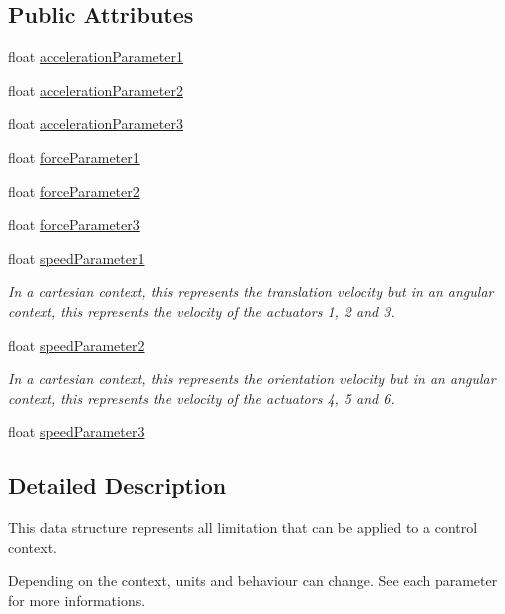 \subsection*{Public Attributes}
\begin{DoxyCompactItemize}
\item 
float \hyperlink{structLimitation_a695b233ff2bd5f53460fcadad86c0cfa}{acceleration\+Parameter1}
\item 
float \hyperlink{structLimitation_a1bc77d927cb14ce2f963ccfa53fb0d99}{acceleration\+Parameter2}
\item 
float \hyperlink{structLimitation_a23cd4303674bd42a0e583fced50a3511}{acceleration\+Parameter3}
\item 
float \hyperlink{structLimitation_abafcff837c521cea6d410245547b148e}{force\+Parameter1}
\item 
float \hyperlink{structLimitation_a4a48f99b82a0078cfedb029c92355bef}{force\+Parameter2}
\item 
float \hyperlink{structLimitation_a25a3f8ac4759c63b46d2201b651817e5}{force\+Parameter3}
\item 
float \hyperlink{structLimitation_a3d36f2f90548acecb3e080d8c47d00f2}{speed\+Parameter1}
\begin{DoxyCompactList}\small\item\em In a cartesian context, this represents the translation velocity but in an angular context, this represents the velocity of the actuators 1, 2 and 3. \end{DoxyCompactList}\item 
float \hyperlink{structLimitation_aa17c9688bba54c9a8e2208d38266ae93}{speed\+Parameter2}
\begin{DoxyCompactList}\small\item\em In a cartesian context, this represents the orientation velocity but in an angular context, this represents the velocity of the actuators 4, 5 and 6. \end{DoxyCompactList}\item 
float \hyperlink{structLimitation_a3d2e542a721c712b06b70f554d10d468}{speed\+Parameter3}
\end{DoxyCompactItemize}


\subsection{Detailed Description}
This data structure represents all limitation that can be applied to a control context. 

Depending on the context, units and behaviour can change. See each parameter for more informations. 


